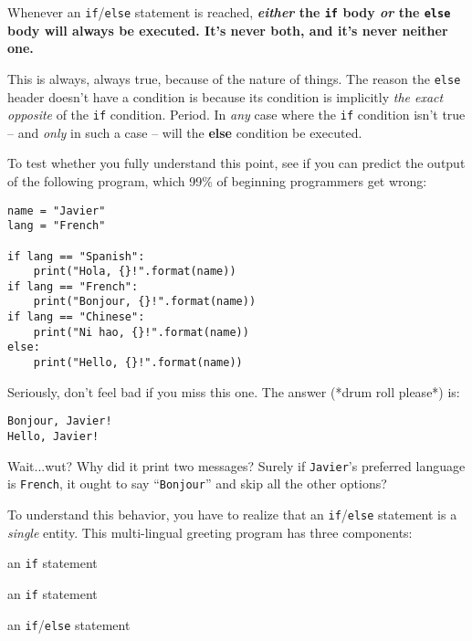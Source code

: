 \begin{shaded}
Whenever an \texttt{if}/\texttt{else} statement is reached,
\textbf{\textit{either} the \texttt{if} body \textit{or} the \texttt{else}
body will always be executed. It's never both, and it's never neither one.}
\end{shaded}

This is always, always true, because of the nature of things. The reason the
\texttt{else} header doesn't have a condition is because its condition is
implicitly \textit{the exact opposite} of the \texttt{if} condition. Period. In
\textit{any} case where the \texttt{if} condition isn't true -- and
\textit{only} in such a case -- will the \textbf{else} condition be executed.

To test whether you fully understand this point, see if you can predict the
output of the following program, which 99\% of beginning programmers get wrong:

\begin{Verbatim}[fontsize=\small,samepage=true,frame=single,framesep=3mm]
name = "Javier"
lang = "French"

if lang == "Spanish":
    print("Hola, {}!".format(name))
if lang == "French":
    print("Bonjour, {}!".format(name))
if lang == "Chinese":
    print("Ni hao, {}!".format(name))
else:
    print("Hello, {}!".format(name))
\end{Verbatim}
\vspace{-.2in}

Seriously, don't feel bad if you miss this one. The answer (*drum roll please*)
is:

\begin{Verbatim}[fontsize=\small,samepage=true,frame=leftline,framesep=5mm,framerule=1mm]
Bonjour, Javier!
Hello, Javier!
\end{Verbatim}

Wait...wut? Why did it print two messages? Surely if \texttt{Javier}'s
preferred language is \texttt{French}, it ought to say ``\texttt{Bonjour}'' and
skip all the other options?

To understand this behavior, you have to realize that an
\texttt{if}/\texttt{else} statement is a \textit{single} entity. This
multi-lingual greeting program has three components:

\begin{samepage}
\begin{compactenum}
\item an \texttt{if} statement
\item an \texttt{if} statement
\item an \texttt{if}/\texttt{else} statement
\end{compactenum}
\end{samepage}

